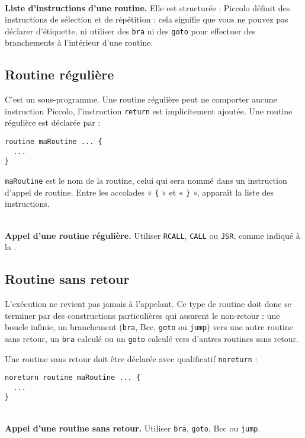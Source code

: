 ~\\
\textbf{Liste d’instructions d’une routine.} Elle est structurée : Piccolo définit des instructions de sélection et de répétition : cela signifie que vous ne pouvez pas déclarer d’étiquette, ni utiliser des \texttt{bra} ni des \texttt{goto} pour effectuer des branchements à l’intérieur d’une routine.


\subsection{Routine régulière}

C'est un sous-programme. Une routine régulière peut ne comporter aucune instruction Piccolo, l'instruction \texttt{return} est implicitement ajoutée. Une routine régulière est déclarée par :
\begin{lstlisting}[language=piccolo]
routine maRoutine ... {
  ...
}
\end{lstlisting}

\texttt{maRoutine} est le nom de la routine, celui qui sera nommé dans un instruction d’appel de routine. Entre les accolades « \texttt{\{} » et « \texttt{\}} », apparaît la liste des instructions.

~\\
\textbf{Appel d’une routine régulière.} Utiliser \texttt{RCALL}, \texttt{CALL} ou \texttt{JSR}, comme indiqué à la .

\subsection{Routine sans retour}

L’exécution ne revient pas jamais à l’appelant. Ce type de routine doit donc se terminer par des constructions particulières qui assurent le non-retour : une boucle infinie, un branchement (\texttt{bra}, Bcc, \texttt{goto} ou \texttt{jump}) vers une autre routine sans retour, un \texttt{bra} calculé ou un \texttt{goto} calculé vers d’autres routines sans retour.

Une routine sans retour doit être déclarée avec qualificatif \texttt{noreturn} :
\begin{lstlisting}[language=piccolo]
noreturn routine maRoutine ... {
  ...
}
\end{lstlisting}

~\\
\textbf{Appel d’une routine sans retour.} Utiliser \texttt{bra}, \texttt{goto}, Bcc ou \texttt{jump}.


